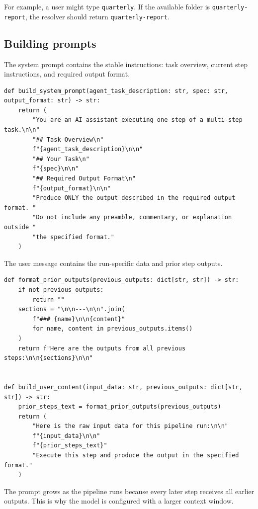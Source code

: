 \documentclass[12pt, a4paper]{article}
\begin{document}
For example, a user might type \texttt{quarterly}. If the available folder is \texttt{quarterly-report}, the resolver should return \texttt{quarterly-report}.

\subsection{Building prompts}

The system prompt contains the stable instructions: task overview, current step instructions, and required output format.

\begin{lstlisting}[style=pythonstyle]
def build_system_prompt(agent_task_description: str, spec: str, output_format: str) -> str:
    return (
        "You are an AI assistant executing one step of a multi-step task.\n\n"
        "## Task Overview\n"
        f"{agent_task_description}\n\n"
        "## Your Task\n"
        f"{spec}\n\n"
        "## Required Output Format\n"
        f"{output_format}\n\n"
        "Produce ONLY the output described in the required output format. "
        "Do not include any preamble, commentary, or explanation outside "
        "the specified format."
    )
\end{lstlisting}

The user message contains the run-specific data and prior step outputs.

\begin{lstlisting}[style=pythonstyle]
def format_prior_outputs(previous_outputs: dict[str, str]) -> str:
    if not previous_outputs:
        return ""
    sections = "\n\n---\n\n".join(
        f"### {name}\n\n{content}"
        for name, content in previous_outputs.items()
    )
    return f"Here are the outputs from all previous steps:\n\n{sections}\n\n"


def build_user_content(input_data: str, previous_outputs: dict[str, str]) -> str:
    prior_steps_text = format_prior_outputs(previous_outputs)
    return (
        "Here is the raw input data for this pipeline run:\n\n"
        f"{input_data}\n\n"
        f"{prior_steps_text}"
        "Execute this step and produce the output in the specified format."
    )
\end{lstlisting}

\begin{warnbox}
The prompt grows as the pipeline runs because every later step receives all earlier outputs. This is why the model is configured with a larger context window.
\end{warnbox}
\end{document}
